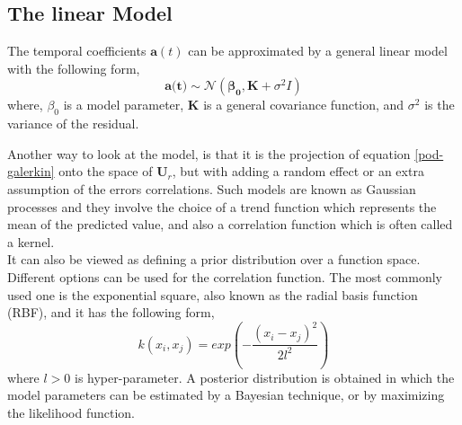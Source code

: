 \documentclass{anstrans}
\begin{document}
\subsection{The linear Model}
The temporal coefficients $\textbf{a}(t)$ can be approximated by a general linear model with the following form,  
\begin{equation}
\textbf{a(t)} \sim \mathcal{N} ({\boldsymbol{\beta_0}}, \textbf{K}+ \sigma^2I)
\end{equation}
where, $\beta_0$ is a model parameter, $\textbf{K}$ is a general covariance function, and $\sigma^2$ is the variance of the residual.

Another way to look at the model, is that it is the projection of equation \ref{pod-galerkin} onto the space of $\textbf{U}_r$, but with adding a random effect or an extra assumption of the errors correlations.
Such models are known as Gaussian processes \cite{rasmussen2003gaussian} and they involve the choice of a trend function which represents the mean of the predicted value, and also a correlation function which is often called a kernel. \\
It can also be viewed as defining a prior distribution over a function space.
Different options can be used for the correlation function. The most commonly used one is the exponential square, also known as the radial basis function (RBF), and it has the following form,
\begin{equation}
k(x_i, x_j) =  exp(-\frac{(x_i - x_j)^2}{2l^2})
\end{equation}
where $l > 0$ is hyper-parameter. A posterior distribution is obtained in which the model parameters can be estimated by a Bayesian technique, or by maximizing the likelihood function.
\end{document}
